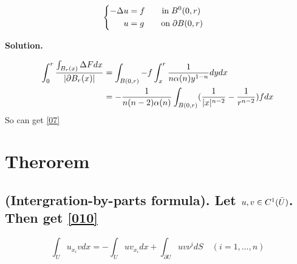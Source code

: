 \documentclass[a4paper]{book}
\newenvironment{solution}%
{\noindent\textbf{Solution.}}%
{\qedhere}
\numberwithin{equation}{chapter}
\theoremstyle{definition}
\begin{document}
\begin{multicols}{2}
\begin{equation}\label{08}
	\begin{cases}
	\begin{aligned}
	-\Delta u &= f \qquad \text{in} \; \mathnormal{B}^0(0,r) \\
	u &= g \qquad \text{on} \; \partial\mathnormal{B}(0,r)
	\end{aligned}
	
	\end{cases}
\end{equation}

\begin{solution}
	
%	
%	
	
	\begin{equation}
		\begin{aligned}
		\int_{0}^{r} \frac{\int_{\mathnormal{B}_r (x)} \Delta F dx}{| \partial \mathnormal{B}_r (x) |} &= \int_{\mathnormal{B}(0,r)} -f \int_{x}^{r} \frac{1}{n\alpha(n) y^{1-n}} dy dx \\
		&= -\frac{1}{n(n-2)\alpha(n)} \int_{ \mathnormal{B} (0, r)} ( \frac{1}{|x|^{n-2}} - \frac{1}{r^{n-2}}) f dx
		\end{aligned}
	\end{equation}
	So can get \ref{07}
	

\end{solution}

\section{Therorem}

\subsection{(Intergration-by-parts formula). Let $u,v \in \mathnormal{C}^1(\bar{U})$. Then get \ref{010} }

\begin{equation}\label{010}
	\int_U u_{x_i} v dx = - \int_U uv_{x_i} dx + \int_{\partial U} uv \nu^i dS \quad (i = 1,...,n)
\end{equation}


\end{multicols}
\end{document}
